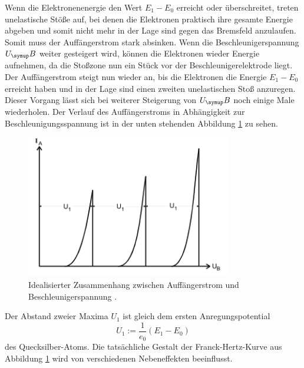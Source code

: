 Wenn die Elektronenenergie den Wert $E_1-E_0$ erreicht oder überschreitet, treten
unelastische Stöße auf, bei denen die Elektronen praktisch ihre gesamte Energie
abgeben und somit nicht mehr in der Lage sind gegen das Bremsfeld anzulaufen.
Somit muss der Auffängerstrom stark absinken.
Wenn die Beschleunigerspannung $U_\su{B}$ weiter gesteigert wird, können die
Elektronen wieder Energie aufnehmen, da die Stoßzone nun ein Stück vor der
Beschleunigerelektrode liegt.
Der Auffängerstrom steigt nun wieder an, bis die Elektronen die Energie $E_1-E_0$
erreicht haben und in der Lage sind einen zweiten unelastischen Stoß anzuregen.
Dieser Vorgang lässt sich bei weiterer Steigerung von $U_\su{B}$ noch einige
Male wiederholen. Der Verlauf des Auffängerstroms in Abhängigkeit zur
Beschleunigungsspannung ist in der unten stehenden Abbildung \ref{fig:kurve} zu
sehen.
\begin{figure}
  \centering
  \includegraphics[width=0.8\textwidth]{bilder/kurve.pdf}
  \caption{Idealisierter Zusammenhang zwischen Auffängerstrom und Beschleunigerspannung
  \cite{601}.}
  \label{fig:kurve}
\end{figure}
Der Abstand zweier Maxima $U_1$ ist gleich dem ersten Anregungspotential
\begin{equation*}
  U_1:=\frac{1}{e_0}(E_1-E_0)
\end{equation*}
des Quecksilber-Atoms.
Die tatsächliche Gestalt der Franck-Hertz-Kurve aus Abbildung \ref{fig:kurve}
wird von verschiedenen Nebeneffekten beeinflusst.

